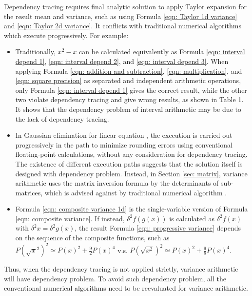 \documentclass[twoside]{article}
\numberwithin{equation}{section}
\begin{document}
Dependency tracing requires final analytic solution to apply Taylor expansion for the result mean and variance, such as using Formula \eqref{eqn: Taylor 1d variance} and \eqref{eqn: Taylor 2d variance}.
It conflicts with traditional numerical algorithms which execute progressively.
For example:
\begin{itemize}
\item 
Traditionally, $x^2 - x$ can be calculated equivalently as Formula \eqref{eqn: interval depend 1}, \eqref{eqn: interval depend 2}, and \eqref{eqn: interval depend 3}.
When applying Formula \eqref{eqn: addition and subtraction}, \eqref{eqn: multiplication}, and \eqref{eqn: square precision} as separated and independent arithmetic operations, only Formula \eqref{eqn: interval depend 1} gives the correct result, while the other two violate dependency tracing and give wrong results, as shown in Table 1.
It shows that the dependency problem of interval arithmetic \cite{Interval_Arithmetic} may be due to the lack of dependency tracing.

\item In Gaussian elimination for linear equation \cite{Numerical_Recipes}, the execution is carried out progressively in the path to minimize rounding errors using conventional floating-point calculations, without any consideration for dependency tracing.
The existence of different execution paths suggests that the solution itself is designed with dependency problem.
Instead, in Section \ref{sec: matrix}, variance arithmetic uses the matrix inversion formula by the determinants of sub-matrices, which is advised against by traditional numerical algorithm \cite{Numerical_Recipes}.

\item Formula \eqref{eqn: composite variance 1d} is the single-variable version of Formula \eqref{eqn: composite variance}.
If instead, $\delta^2 f(g(x))$ is calculated as $\delta^2 f(x)$ with $\delta^2 x = \delta^2 g(x)$, the result Formula \eqref{eqn: progressive variance} depends on the sequence of the composite functions, such as $P(\sqrt{x}^2)^2 \simeq P(x)^2 + \frac{9}{2} P(x)^4$ v.s. $P(\sqrt{x^2})^2 \simeq P(x)^2 + \frac{9}{8} P(x)^4$.
\end{itemize}
Thus, when the dependency tracing is not applied strictly, variance arithmetic will have dependency problem.
To avoid such dependency problem, all the conventional numerical algorithms need to be reevaluated for variance arithmetic.
\end{document}
